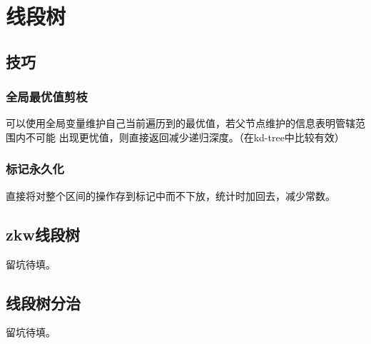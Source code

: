 \section{线段树}
\subsection{技巧}
\subsubsection{全局最优值剪枝}
可以使用全局变量维护自己当前遍历到的最优值，若父节点维护的信息表明管辖范围内不可能
出现更忧值，则直接返回减少递归深度。（在kd-tree中比较有效）
\subsubsection{标记永久化}
直接将对整个区间的操作存到标记中而不下放，统计时加回去，减少常数。
\subsection{zkw线段树}
留坑待填。
\subsection{线段树分治}
留坑待填。
